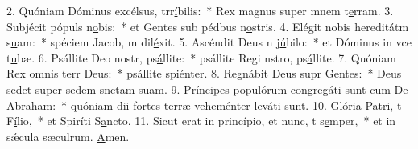 2. Quóniam Dóminus excélsus, trr\uline{í}bilis:~* Rex magnus super mnem t\uline{e}rram.
3. Subjécit pópuls n\uline{o}bis:~* et Gentes sub pédbus n\uline{o}stris.
4. Elégit nobis hereditátm s\uline{u}am:~* spéciem Jacob, m dil\uline{é}xit.
5. Ascéndit Deus n j\uline{ú}bilo:~* et Dóminus in vce t\uline{u}bæ.
6. Psállite Deo nostr, ps\uline{á}llite:~* psállite Regi nstro, ps\uline{á}llite.
7. Quóniam Rex omnis terr D\uline{e}us:~* psállite spi\uline{é}nter.
8. Regnábit Deus supr G\uline{e}ntes:~* Deus sedet super sedem snctam s\uline{u}am.
9. Príncipes populórum congregáti sunt cum De \uline{A}braham:~* quóniam dii fortes terræ veheménter lev\uline{á}ti sunt.
10. Glória Patri, t F\uline{í}lio,~* et Spiríti S\uline{a}ncto.
11. Sicut erat in princípio, et nunc, t s\uline{e}mper,~* et in sǽcula sæculrum. \uline{A}men.
